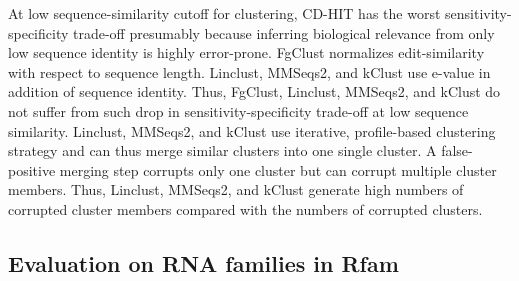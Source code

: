 \documentclass[11pt,letterpaper]{article}
\begin{document}
At low sequence-similarity cutoff for clustering,
CD-HIT has the worst sensitivity-specificity trade-off presumably because inferring biological relevance from only low sequence identity is highly error-prone.
FgClust normalizes edit-similarity with respect to sequence length.
Linclust, MMSeqs2, and kClust use e-value in addition of sequence identity.
Thus, FgClust, Linclust, MMSeqs2, and kClust do not suffer from such drop in sensitivity-specificity trade-off at low sequence similarity.
Linclust, MMSeqs2, and kClust use iterative, profile-based clustering strategy and can thus merge similar clusters into one single cluster.
A false-positive merging step corrupts only one cluster but can corrupt multiple cluster members.
Thus, Linclust, MMSeqs2, and kClust generate high numbers of corrupted cluster members compared with the numbers of corrupted clusters.

\subsection{Evaluation on RNA families in Rfam}
\end{document}
